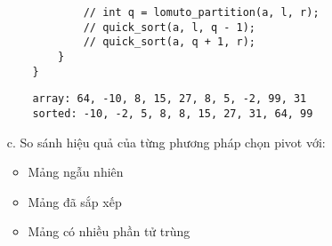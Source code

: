 \documentclass[12pt,a4paper]{article}
\begin{document}
\begin{enumerate}
\begin{verbatim}
            // int q = lomuto_partition(a, l, r);
            // quick_sort(a, l, q - 1);
            // quick_sort(a, q + 1, r);
        }
    }
    \end{verbatim}

    \begin{verbatim}
    array: 64, -10, 8, 15, 27, 8, 5, -2, 99, 31
    sorted: -10, -2, 5, 8, 8, 15, 27, 31, 64, 99
    \end{verbatim}

    \item[c.] So sánh hiệu quả của từng phương pháp chọn pivot với:
        \begin{itemize}
            \item Mảng ngẫu nhiên
            \item Mảng đã sắp xếp
            \item Mảng có nhiều phần tử trùng
        \end{itemize}
\end{enumerate}
\end{document}
